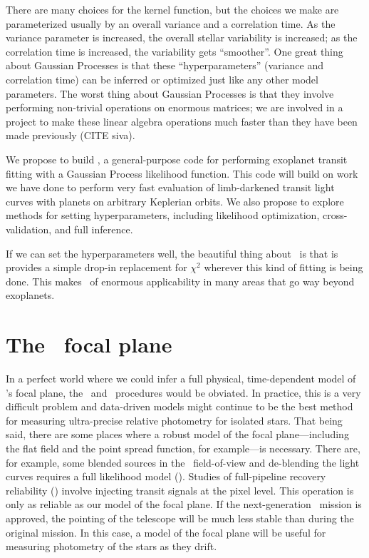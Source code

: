 \documentclass[letterpaper,12pt,preprint]{hack_aastex}
\begin{document}

There are many choices for the kernel function, but the choices we make are
parameterized usually by an overall variance and a correlation time.
As the variance parameter is increased, the overall stellar variability is
increased; as the correlation time is increased, the variability gets
``smoother''.
One great thing about Gaussian Processes is that these ``hyperparameters''
(variance and correlation time) can be inferred or optimized just like
any other model parameters.
The worst thing about Gaussian Processes is that they involve performing
non-trivial operations on enormous matrices;
we are involved in a project to make these linear algebra operations much
faster than they have been made previously (CITE siva).

We propose to build \George,
a general-purpose code for performing exoplanet transit
fitting with a Gaussian Process likelihood function.
This code will build on work we have done to perform very fast evaluation
of limb-darkened transit light curves with planets on arbitrary Keplerian
orbits.
We also propose to explore methods for setting hyperparameters,
including likelihood optimization, cross-validation, and full inference.

If we can set the hyperparameters well, the beautiful thing about \George\ is
that is provides a simple drop-in replacement for $\chi^2$ wherever this kind
of fitting is being done.
This makes \George\ of enormous applicability in many areas that go way beyond
exoplanets.

\section{The \Kepler\ focal plane}

In a perfect world where we could infer a full physical, time-dependent model
of \Kepler's focal plane, the \PLM\ and \OWL\ procedures would be obviated.
In practice, this is a very difficult problem and data-driven models might
continue to be the best method for measuring ultra-precise relative photometry
for isolated stars.
That being said, there are some places where a robust model of the focal
plane---including the flat field and the point spread function, for
example---is necessary.
There are, for example, some blended sources in the \Kepler\ field-of-view and
de-blending the light curves requires a full likelihood model (\citealt{psf}).
Studies of full-pipeline recovery reliability (\citealt{inject}) involve
injecting transit signals at the pixel level.
This operation is only as reliable as our model of the focal plane.
If the next-generation \Kepler\ mission is approved, the pointing of the
telescope will be much less stable than during the original mission.
In this case, a model of the focal plane will be useful for measuring
photometry of the stars as they drift.
\end{document}
